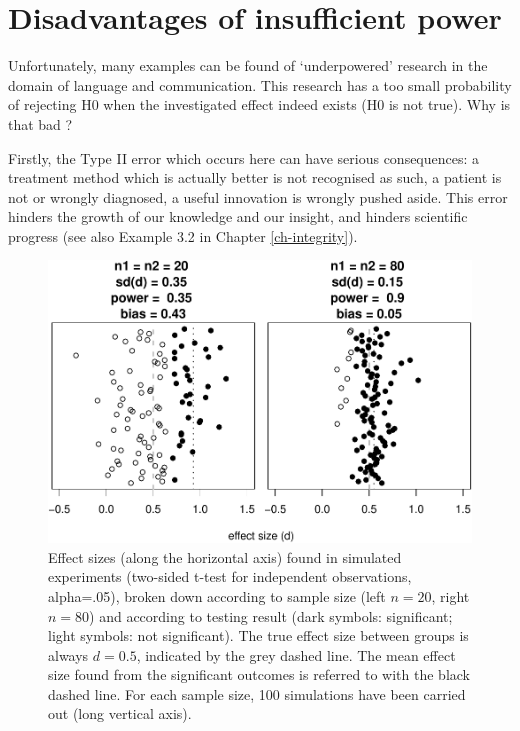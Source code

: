 \documentclass[
]{book}
\begin{document}
\hypertarget{disadvantages-of-insufficient-power}{%
\section{Disadvantages of insufficient power}\label{disadvantages-of-insufficient-power}}

Unfortunately, many examples can be found of `underpowered' research
in the domain of language and communication. This research has a too small
probability of rejecting H0 when the investigated effect indeed
exists (H0 is not true). Why is that bad \citep{Quene10}?

Firstly, the Type II error which occurs here can have serious consequences:
a treatment method which is actually better is not recognised as such,
a patient is not or wrongly diagnosed, a useful innovation is wrongly pushed
aside. This error hinders the growth of our knowledge and our insight, and hinders
scientific progress (see also
Example 3.2 in Chapter \ref{ch-integrity}).

\begin{figure}
\centering
\includegraphics{QMS-EN_files/figure-latex/underpoweredeffectsizes-1.pdf}
\caption{\label{fig:underpoweredeffectsizes}Effect sizes (along the horizontal axis) found in simulated experiments (two-sided t-test for independent observations, alpha=.05), broken down according to sample size (left \(n=20\), right \(n=80\)) and according to testing result (dark symbols: significant; light symbols: not significant). The true effect size between groups is always \(d=0.5\), indicated by the grey dashed line. The mean effect size found from the significant outcomes is referred to with the black dashed line. For each sample size, 100 simulations have been carried out (long vertical axis).}
\end{figure}
\end{document}
